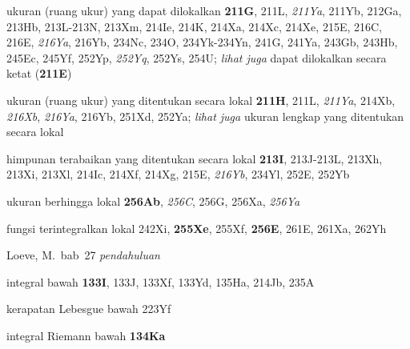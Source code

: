 



ukuran (ruang ukur) yang dapat dilokalkan {\bf 211G}, 211L, {\it 211Ya}, 211Yb,
212Ga, 213Hb, 213L-213N, 
213Xm, 214Ie, 214K, 214Xa, 214Xc, 214Xe, 215E, 216C, 216E,
{\it 216Ya}, 216Yb, 234Nc, 234O,
234Yk-234Yn, 
241G, 241Ya, 243Gb, 243Hb,
245Ec, 245Yf,
252Yp, {\it 252Yq}, 252Ys, 254U; 
  {\it lihat juga} dapat dilokalkan secara ketat ({\bf 211E})




















ukuran (ruang ukur) yang ditentukan secara lokal {\bf 211H}, 211L, {\it 211Ya},
214Xb, {\it 216Xb}, {\it 216Ya}, 216Yb, 251Xd, 252Ya; 
  {\it lihat juga} ukuran lengkap yang ditentukan secara lokal


himpunan terabaikan yang ditentukan secara lokal {\bf 213I},
213J-213L, 
213Xh, 213Xi, 213Xl,
214Ic, 214Xf, 214Xg, 215E, {\it 216Yb}, 234Yl, 252E, 252Yb




ukuran berhingga lokal {\bf 256Ab}, {\it 256C}, 256G, 256Xa, {\it
256Ya}






fungsi terintegralkan lokal 242Xi, {\bf 255Xe}, 255Xf, {\bf 256E},
261E, 261Xa, 262Yh








Lo{\grv e}ve, M.\  bab\ 27 {\it pendahuluan}
















integral bawah {\bf 133I}, 133J, 133Xf, 133Yd, 135Ha,
  214Jb, 235A

kerapatan Lebesgue bawah 223Yf




integral Riemann bawah {\bf 134Ka}


